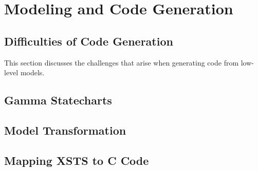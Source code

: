 \chapter{Modeling and Code Generation}



\section{Difficulties of Code Generation}

This section discusses the challenges that arise when generating code from low-level models.

\section{Gamma Statecharts}



\section{Model Transformation}



\section{Mapping XSTS to C Code}

